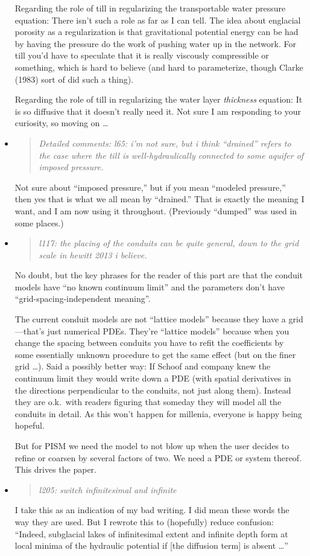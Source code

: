 \documentclass[11pt,reqno]{amsart}
\newcommand{\reply}[2]{
\medskip\medskip
\item  \begin{quote}
\emph{#1}
\end{quote}

\medskip
\noindent #2}
\begin{document}
\begin{itemize}
{\medskip
Regarding the role of till in regularizing the transportable water pressure equation:  There isn't such a role as far as I can tell.  The idea about englacial porosity as a regularization is that gravitational potential energy can be had by having the pressure do the work of pushing water up in the network.  For till you'd have to speculate that it is really viscously compressible or something, which is hard to believe (and hard to parameterize, though Clarke (1983) sort of did such a thing).

\medskip
Regarding the role of till in regularizing the water layer \emph{thickness} equation:  It is so diffusive that it doesn't really need it.  Not sure I am responding to your curiosity, so moving on \dots}

\reply{Detailed comments:
l65: i'm not sure, but i think ``drained'' refers to the case where the till is well-hydraulically connected to some aquifer of imposed pressure.}{Not sure about ``imposed pressure,'' but if you mean ``modeled pressure,'' then yes that is what we all mean by ``drained.''  That is exactly the meaning I want, and I am now using it throughout.  (Previously ``dumped'' was used in some places.)}

\reply{l117: the placing of the conduits can be quite general, down to the grid scale in hewitt 2013 i believe.}{No doubt, but the key phrases for the reader of this part are that the conduit models have ``no known continuum limit'' and the parameters don't have ``grid-spacing-independent meaning''.

\medskip
The current conduit models are not ``lattice models'' because they have a grid---that's just numerical PDEs.  They're ``lattice models'' because when you change the spacing between conduits you have to refit the coefficients by some essentially unknown procedure to get the same effect (but on the finer grid \dots).  Said a possibly better way: If Schoof and company knew the continuum limit they would write down a PDE (with spatial derivatives in the directions perpendicular to the conduits, not just along them).  Instead they are o.k.~with readers figuring that someday they will model all the conduits in detail.  As this won't happen for millenia, everyone is happy being hopeful.

\medskip
But for PISM we need the model to not blow up when the user decides to refine or coarsen by several factors of two.  We need a PDE or system thereof.  This drives the paper.}

\reply{l205: switch infinitesimal and infinite}{I take this as an indication of my bad writing.  I did mean these words the way they are used.  But I rewrote this to (hopefully) reduce confusion: ``Indeed, subglacial lakes of infinitesimal extent and infinite depth form at local minima of the hydraulic potential if [the diffusion term] is absent \dots''}


\end{itemize}
\end{document}
